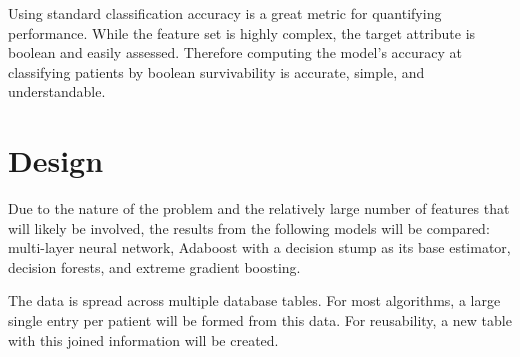 \documentclass[11pt]{article}
\begin{document}
	Using standard classification accuracy is a great metric for quantifying performance. While the feature set is highly complex, the target attribute is boolean and easily assessed. Therefore computing the model's accuracy at classifying patients by boolean survivability is accurate, simple, and understandable.
	
	\section{Design}
	Due to the nature of the problem and the relatively large number of features that will likely be involved, the results from the following models will be compared: multi-layer neural network, Adaboost with a decision stump as its base estimator, decision forests, and extreme gradient boosting.
	
	The data is spread across multiple database tables. For most algorithms, a large single entry per patient will be formed from this data. For reusability, a new table with this joined information will be created.
	
\end{document}
